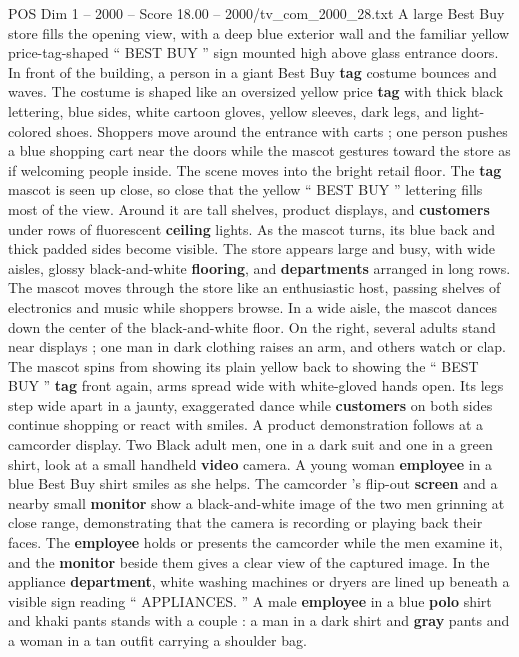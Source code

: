 \begin{textsample}{POS Dim 1 – 2000 – Score 18.00 – 2000/tv\_com\_2000\_28.txt}  \label{ex:f1_pos_032}
A large Best Buy store fills the opening view, with a deep blue exterior wall and the familiar yellow price-tag-shaped “ BEST BUY ” sign mounted high above glass entrance doors.
In front of the building, a person in a giant Best Buy \textbf{tag} costume bounces and waves.
The costume is shaped like an oversized yellow price \textbf{tag} with thick black lettering, blue sides, white cartoon gloves, yellow sleeves, dark legs, and light-colored shoes.
Shoppers move around the entrance with carts ; one person pushes a blue shopping cart near the doors while the mascot gestures toward the store as if welcoming people inside.
The scene moves into the bright retail floor.
The \textbf{tag} mascot is seen up close, so close that the yellow “ BEST BUY ” lettering fills most of the view.
Around it are tall shelves, product displays, and \textbf{customers} under rows of fluorescent \textbf{ceiling} lights.
As the mascot turns, its blue back and thick padded sides become visible.
The store appears large and busy, with wide aisles, glossy black-and-white \textbf{flooring}, and \textbf{departments} arranged in long rows.
The mascot moves through the store like an enthusiastic host, passing shelves of electronics and music while shoppers browse.
In a wide aisle, the mascot dances down the center of the black-and-white floor.
On the right, several adults stand near displays ; one man in dark clothing raises an arm, and others watch or clap.
The mascot spins from showing its plain yellow back to showing the “ BEST BUY ” \textbf{tag} front again, arms spread wide with white-gloved hands open.
Its legs step wide apart in a jaunty, exaggerated dance while \textbf{customers} on both sides continue shopping or react with smiles.
A product demonstration follows at a camcorder display.
Two Black adult men, one in a dark suit and one in a green shirt, look at a small handheld \textbf{video} camera.
A young woman \textbf{employee} in a blue Best Buy shirt smiles as she helps.
The camcorder ’s flip-out \textbf{screen} and a nearby small \textbf{monitor} show a black-and-white image of the two men grinning at close range, demonstrating that the camera is recording or playing back their faces.
The \textbf{employee} holds or presents the camcorder while the men examine it, and the \textbf{monitor} beside them gives a clear view of the captured image.
In the appliance \textbf{department}, white washing machines or dryers are lined up beneath a visible sign reading “ APPLIANCES. ” A male \textbf{employee} in a blue \textbf{polo} shirt and khaki pants stands with a couple : a man in a dark shirt and \textbf{gray} pants and a woman in a tan outfit carrying a shoulder bag.

\end{textsample}
